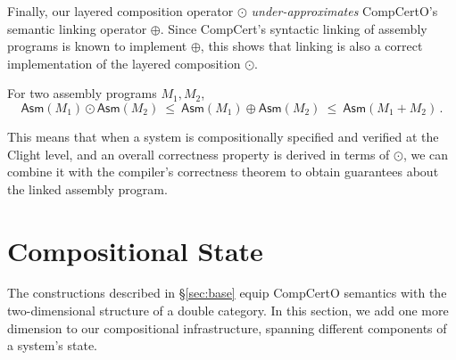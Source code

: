 \documentclass[acmsmall,screen,review,anonymous]{acmart}
\newcommand{\kw}[1]{\ensuremath{ \mathsf{#1} }}
\begin{document}
Finally,
our layered composition operator $\odot$
\emph{under-approximates}
CompCertO's semantic linking operator $\oplus$.
Since CompCert's syntactic linking of assembly programs
is known to implement $\oplus$,
this shows that linking is also a correct implementation of
the layered composition $\odot$.

\begin{theorem}
For two assembly programs $M_1, M_2$,
\[
  \kw{Asm}(M_1) \odot \kw{Asm}(M_2)
  \:\le\:
  \kw{Asm}(M_1) \oplus \kw{Asm}(M_2)
  \:\le\:
  \kw{Asm}(M_1 + M_2)
 \,.
\]
\end{theorem}

This means that when a system is compositionally
specified and verified at the Clight level,
and an overall correctness property is derived
in terms of $\odot$,
we can combine it with the compiler's correctness theorem
to obtain guarantees about the linked assembly program.



\section{Compositional State} \label{sec:scomp} %

The constructions described in \S\ref{sec:base}
equip CompCertO semantics
with the two-dimensional structure of a double category.
In this section,
we add one more dimension to our compositional infrastructure,
spanning different components of a system's state.

%
%
\end{document}
